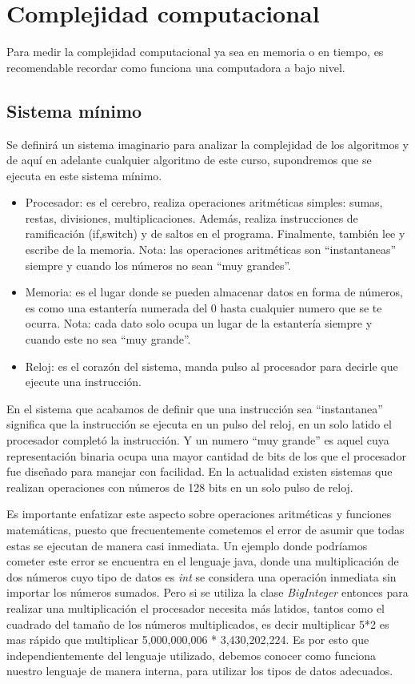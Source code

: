 \chapter{Complejidad computacional}

Para medir la complejidad computacional ya sea en memoria o en tiempo, es recomendable recordar como funciona una computadora a bajo nivel.

\section{Sistema mínimo}

 Se definirá un sistema imaginario  para analizar la complejidad  de los algoritmos y de aquí en adelante cualquier algoritmo de este curso, supondremos que se ejecuta en este sistema mínimo. 

\begin{itemize}
    \item Procesador: es el cerebro, realiza operaciones aritméticas simples: sumas, restas, divisiones, multiplicaciones. Además, realiza instrucciones de ramificación (if,switch) y de saltos en el programa. Finalmente, también lee y escribe de la memoria. Nota: las operaciones aritméticas son ``instantaneas'' siempre y cuando los números no sean ``muy grandes''.
    \item Memoria: es el lugar donde se pueden almacenar datos en forma de números, es como una estantería numerada del 0 hasta cualquier numero que se te ocurra. Nota: cada dato solo ocupa un lugar de la estantería siempre y cuando este no sea ``muy grande''.
    \item Reloj: es el corazón del sistema, manda pulso al procesador para decirle que ejecute una instrucción. 
\end{itemize}

En el sistema que acabamos de definir que una instrucción sea ``instantanea'' significa que la instrucción se ejecuta en un pulso del reloj, en un solo latido el procesador completó la instrucción. Y un numero ``muy grande'' es aquel cuya representación binaria ocupa una mayor cantidad de bits de los que el procesador fue diseñado para manejar con facilidad. En la actualidad existen sistemas que realizan operaciones con números de 128 bits en un solo pulso de reloj.

Es importante enfatizar este aspecto sobre operaciones aritméticas y funciones matemáticas, puesto que frecuentemente cometemos el error de asumir que todas estas se ejecutan de manera casi inmediata. Un ejemplo donde podríamos cometer este error se encuentra en el lenguaje java, donde una multiplicación de dos números cuyo tipo de datos es \emph{int} se considera una operación inmediata sin importar los números sumados. Pero si se utiliza la clase \emph{BigInteger} entonces para realizar una multiplicación el procesador necesita más latidos, tantos como el cuadrado del tamaño de los números multiplicados, es decir multiplicar 5*2 es mas rápido que multiplicar 5,000,000,006 *  3,430,202,224. Es por esto que independientemente del lenguaje utilizado, debemos conocer como funciona nuestro lenguaje de manera interna, para utilizar los tipos de datos adecuados.


